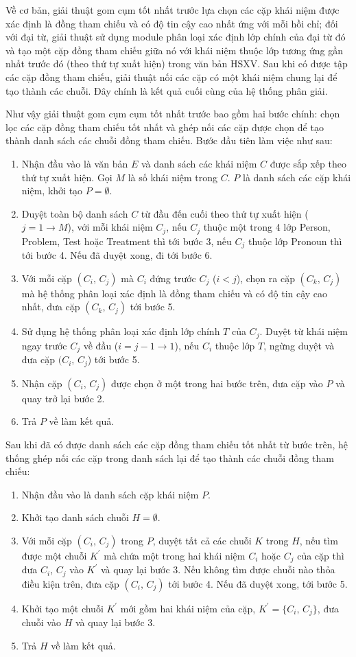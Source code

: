 Về cơ bản, giải thuật gom cụm tốt nhất trước lựa chọn các cặp khái niệm được xác định là đồng tham chiếu và có độ tin cậy cao nhất ứng với mỗi hồi chỉ; đối với đại từ, giải thuật sử dụng module phân loại xác định lớp chính của đại từ đó và tạo một cặp đồng tham chiếu giữa nó với khái niệm thuộc lớp tương ứng gần nhất trước đó (theo thứ tự xuất hiện) trong văn bản HSXV. Sau khi có được tập các cặp đồng tham chiếu, giải thuật nối các cặp có một khái niệm chung lại để tạo thành các chuỗi. Đây chính là kết quả cuối cùng của hệ thống phân giải.

Như vậy giải thuật gom cụm cụm tốt nhất trước bao gồm hai bước chính: chọn lọc các cặp đồng tham chiếu tốt nhất và ghép nối các cặp được chọn để tạo thành danh sách các chuỗi đồng tham chiếu. Bước đầu tiên làm việc như sau:
\begin{enumerate}
\item Nhận đầu vào là văn bản $E$ và danh sách các khái niệm $C$ được sắp xếp theo thứ tự xuất hiện. Gọi $M$ là số khái niệm trong $C$. $P$ là danh sách các cặp khái niệm, khởi tạo $P=\emptyset$.
\item Duyệt toàn bộ danh sách $C$ từ đầu đến cuối theo thứ tự xuất hiện ($j=1\rightarrow M$), với mỗi khái niệm $C_j$, nếu $C_j$ thuộc một trong 4 lớp Person, Problem, Test hoặc Treatment thì tới bước 3, nếu $C_j$ thuộc lớp Pronoun thì tới bước 4. Nếu đã duyệt xong, đi tới bước 6.
\item Với mỗi cặp $(C_i,\,C_j)$ mà $C_i$ đứng trước $C_j$ ($i<j$), chọn ra cặp $(C_k,\,C_j)$ mà hệ thống phân loại xác định là đồng tham chiếu và có độ tin cậy cao nhất, đưa cặp $(C_k,\,C_j)$ tới bước 5.
\item Sử dụng hệ thống phân loại xác định lớp chính $T$ của $C_j$. Duyệt từ khái niệm ngay trước $C_j$ về đầu ($i=j-1\rightarrow 1$), nếu $C_i$ thuộc lớp $T$, ngừng duyệt và đưa cặp $(C_i,\,C_j$) tới bước 5.
\item Nhận cặp $(C_i,\,C_j)$ được chọn ở một trong hai bước trên, đưa cặp vào $P$ và quay trở lại bước 2.
\item Trả $P$ về làm kết quả.
\end{enumerate} 

Sau khi đã có được danh sách các cặp đồng tham chiếu tốt nhất từ bước trên, hệ thống ghép nối các cặp trong danh sách lại để tạo thành các chuỗi đồng tham chiếu:
\begin{enumerate}
\item Nhận đầu vào là danh sách cặp khái niệm $P$.
\item Khởi tạo danh sách chuỗi $H=\emptyset$.
\item Với mỗi cặp $(C_i,\,C_j)$ trong $P$, duyệt tất cả các chuỗi $K$ trong $H$, nếu tìm được một chuỗi $K^{\prime}$ mà chứa một trong hai khái niệm $C_i$ hoặc $C_j$ của cặp thì đưa $C_i$, $C_j$ vào $K^{\prime}$ và quay lại bước 3. Nếu không tìm được chuỗi nào thỏa điều kiện trên, đưa cặp $(C_i,\,C_j)$ tới bước 4. Nếu đã duyệt xong, tới bước 5.
\item Khởi tạo một chuỗi $K^{\prime}$ mới gồm hai khái niệm của cặp, $K^{\prime}=\{C_i,\,C_j\}$, đưa chuỗi vào $H$ và quay lại bước 3.
\item Trả $H$ về làm kết quả.
\end{enumerate}
